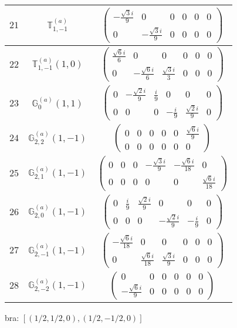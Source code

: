\documentclass[fleqn,8pt,landscape]{jsarticle}
\begin{document}
\begin{center}
\begin{longtable}{ccc}
$ 21 $ & $ \mathbb{T}_{1,-1}^{(a)} $ & $ \begin{pmatrix} - \frac{\sqrt{3} i}{9} & 0 & 0 & 0 & 0 & 0 \\ 0 & - \frac{\sqrt{3} i}{9} & 0 & 0 & 0 & 0 \end{pmatrix} $ \\ \hline
$ 22 $ & $ \mathbb{T}_{1,-1}^{(a)}(1,0) $ & $ \begin{pmatrix} \frac{\sqrt{6} i}{6} & 0 & 0 & 0 & 0 & 0 \\ 0 & - \frac{\sqrt{6} i}{6} & \frac{\sqrt{3} i}{3} & 0 & 0 & 0 \end{pmatrix} $ \\ \hline
$ 23 $ & $ \mathbb{G}_{0}^{(a)}(1,1) $ & $ \begin{pmatrix} 0 & - \frac{\sqrt{2} i}{9} & \frac{i}{9} & 0 & 0 & 0 \\ 0 & 0 & 0 & - \frac{i}{9} & \frac{\sqrt{2} i}{9} & 0 \end{pmatrix} $ \\ \hline
$ 24 $ & $ \mathbb{G}_{2,2}^{(a)}(1,-1) $ & $ \begin{pmatrix} 0 & 0 & 0 & 0 & 0 & \frac{\sqrt{6} i}{9} \\ 0 & 0 & 0 & 0 & 0 & 0 \end{pmatrix} $ \\ \hline
$ 25 $ & $ \mathbb{G}_{2,1}^{(a)}(1,-1) $ & $ \begin{pmatrix} 0 & 0 & 0 & - \frac{\sqrt{3} i}{9} & - \frac{\sqrt{6} i}{18} & 0 \\ 0 & 0 & 0 & 0 & 0 & \frac{\sqrt{6} i}{18} \end{pmatrix} $ \\ \hline
$ 26 $ & $ \mathbb{G}_{2,0}^{(a)}(1,-1) $ & $ \begin{pmatrix} 0 & \frac{i}{9} & \frac{\sqrt{2} i}{9} & 0 & 0 & 0 \\ 0 & 0 & 0 & - \frac{\sqrt{2} i}{9} & - \frac{i}{9} & 0 \end{pmatrix} $ \\ \hline
$ 27 $ & $ \mathbb{G}_{2,-1}^{(a)}(1,-1) $ & $ \begin{pmatrix} - \frac{\sqrt{6} i}{18} & 0 & 0 & 0 & 0 & 0 \\ 0 & \frac{\sqrt{6} i}{18} & \frac{\sqrt{3} i}{9} & 0 & 0 & 0 \end{pmatrix} $ \\ \hline
$ 28 $ & $ \mathbb{G}_{2,-2}^{(a)}(1,-1) $ & $ \begin{pmatrix} 0 & 0 & 0 & 0 & 0 & 0 \\ - \frac{\sqrt{6} i}{9} & 0 & 0 & 0 & 0 & 0 \end{pmatrix} $ \\
\end{longtable}
\end{center}
bra: $[(1/2,1/2,0),(1/2,-1/2,0)]$
\end{document}
